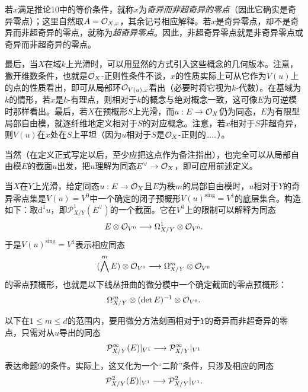 若$x$满足推论10中的等价条件，就称$x$为\emph{奇异而非超奇异的零点}（因此它确实是奇异零点）；这里自然取$A=\mathcal O_{X,x}$，其余记号相应解释。若$x$是奇异零点，却不是奇异而非超奇异的零点，就称为\emph{超奇异零点}。因此，非超奇异零点就是非奇异零点或奇异而非超奇异的零点。

最后，当$X$在域$k$上光滑时，可以用显然的方式引入这些概念的几何版本。注意，撇开维数条件，也就是$\mathcal O_X$-正则性条件不谈，$x$的性质实际上可从它作为$V(u)$上的点的性质看出，即可从局部环$\mathcal O_{V(u),x}$看出（必要时将它视为$k$-代数）。在基域为$k$的情形，若$x$是$k$-有理点，则相对于$k$的概念与绝对概念一致，这可像$E$为可逆模时那样看出。最后，若$X$在预概形$S$上光滑，而$u:E\to\mathcal O_X$仍为同态，$E$为有限型局部自由模，就逐纤维地定义相对于$S$的对应概念。注意，若$x$相对于$S$非超奇异，则$V(u)$在$x$处在$S$上平坦（因为$u$相对于$S$是$\mathcal O_X$-正则的……）。

当然（在定义正式写定以后，至少应把这点作为备注指出），也完全可以从局部自由模$E$的截面$u$出发，把$u$理解为同态$E^\vee\to\mathcal O_X$，即可应用前述定义。

当$X$在$Y$上光滑，给定同态$u:E\to\mathcal O_X$且$E$为秩$m$的局部自由模时，$u$相对于$Y$的奇异零点集是$V(u)=V^0$中一个确定的闭子预概形$V(u)^{\mathrm{sing}}=V^1$的底层集合。构造如下：取$\mathrm d^1u$，即$\mathcal P^1_{X/Y}(E^\vee)$的一个截面。它在$V^0$上的限制可以解释为同态
\[
E\otimes\mathcal O_{V^0}\longrightarrow
\Omega^1_{X/Y}\otimes\mathcal O_{V^0}.
\]
于是$V(u)^{\mathrm{sing}}=V^1$表示相应同态
\[
(\bigwedge^m E)\otimes\mathcal O_{V^0}\longrightarrow
\Omega^m_{X/Y}\otimes\mathcal O_{V^0}
\]
的零点预概形，也就是以下线丛扭曲的微分模中一个确定截面的零点预概形：
\[
\Omega^m_{X/Y}\otimes(\det E)^{-1}\otimes\mathcal O_{V^0}.
\]

以下在$1\le m\le d$的范围内，要用微分方法刻画相对于$Y$的奇异而非超奇异的零点，只需对从$u$导出的同态
\[
\mathcal P^\infty_{X/Y}(E)|_{V^1}\longrightarrow
\mathcal P^\infty_{X/Y}|_{V^1}
\]
表达命题9的条件。实际上，这又化为一个“二阶”条件，只涉及相应的同态
\[
\mathcal P^2_{X/Y}(E)|_{V^1}\longrightarrow
\mathcal P^2_{X/Y}|_{V^1}.
\]

